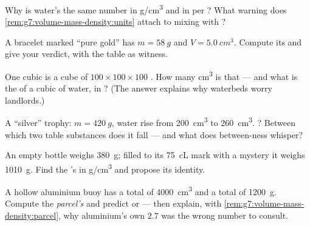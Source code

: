 \begin{exercise}[$\star$]\label{exo:g7:volume-mass-density:6}
Why is water's  the same number in \unit{g/cm^3} and in
 per ? What warning does
\cref{rem:g7:volume-mass-density:units} attach to mixing 
with ?
\end{exercise}

\begin{exercise}[$\star$]\label{exo:g7:volume-mass-density:7}
A bracelet marked ``pure gold'' has $m = \qty{58}{g}$ and
$V = \qty{5.0}{cm^3}$. Compute its  and give your
verdict, with the table as witness.
\end{exercise}

\begin{exercise}[$\star\star$]\label{exo:g7:volume-mass-density:8}
One cubic  is a cube of $100 \times 100 \times 100$
. How many \unit{cm^3} is that --- and what is the
 of a cubic  of water, in ? (The answer
explains why waterbeds worry landlords.)
\end{exercise}

\begin{exercise}[$\star\star$]\label{exo:g7:volume-mass-density:9}
A ``silver'' trophy: $m = \qty{420}{g}$, water rise from
\qty{200}{cm^3} to \qty{260}{cm^3}. ? Between which two
table substances does it fall --- and what does between-ness
whisper?
\end{exercise}

\begin{exercise}[$\star\star$]\label{exo:g7:volume-mass-density:10}
An empty bottle weighs \qty{380}{g}; filled to its \qty{75}{cL}
mark with a mystery  it weighs \qty{1010}{g}. Find the
's  in \unit{g/cm^3} and propose its identity.
\end{exercise}

\begin{exercise}[$\star\star$]\label{exo:g7:volume-mass-density:11}
A hollow aluminium buoy has a total  of \qty{4000}{cm^3}
and a total  of \qty{1200}{g}. Compute the \emph{parcel's}
 and predict  or  --- then explain, with
\cref{rem:g7:volume-mass-density:parcel}, why aluminium's own
$2.7$ was the wrong number to consult.
\end{exercise}

